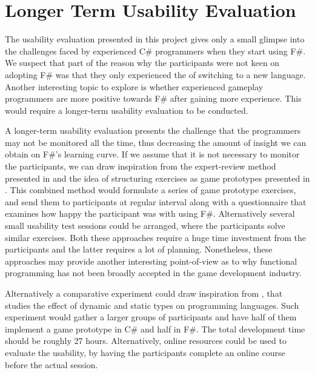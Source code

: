 \section{Longer Term Usability Evaluation}\label{sec:long-term}
The usability evaluation presented in this project gives only a small glimpse into the challenges faced by experienced C\# programmers when they start using F\#. We suspect that part of the reason why the participants were not keen on adopting F\# was that they only experienced the  of switching to a new language. Another interesting topic to explore is whether experienced gameplay programmers are more positive towards F\# after gaining more experience. This would require a longer-term usability evaluation to be conducted.

A longer-term usability evaluation presents the challenge that the programmers may not be monitored all the time, thus decreasing the amount of insight we can obtain on F\#'s learning curve. If we assume that it is not necessary to monitor the participants, we can draw inspiration from the expert-review method presented in \cite{nanz2013examining} and the idea of structuring exercises as game prototypes presented in \cite{bolhuis2019gameplay}. This combined method would formulate a series of game prototype exercises, and send them to participants at regular interval along with a questionnaire that examines how happy the participant was with using F\#. Alternatively several small usability test sessions could be arranged, where the participants solve similar exercises. Both these approaches require a huge time investment from the participants and the latter requires a lot of planning. Nonetheless, these approaches may provide another interesting point-of-view as to why functional programming has not been broadly accepted in the game development industry.

Alternatively a comparative experiment could draw inspiration from \cite{hanenberg2010experiment}, that studies the effect of dynamic and static types on programming languages. Such experiment would gather a larger groups of participants and have half of them implement a game prototype in C\# and half in F\#. The total development time should be roughly 27 hours\cite{hanenberg2010experiment}. Alternatively, online resources could be used to evaluate the usability, by having the participants complete an online course before the actual session.
